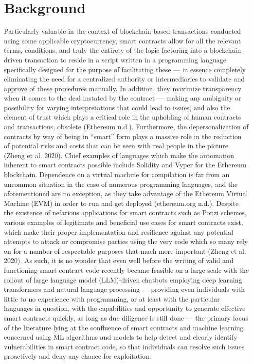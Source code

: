 \documentclass[
  11pt,
]{article}
\begin{document}
\hypertarget{background}{%
\section{Background}\label{background}}

Particularly valuable in the context of blockchain-based transactions
conducted using some applicable cryptocurrency, smart contracts allow
for all the relevant terms, conditions, and truly the entirety of the
logic factoring into a blockchain-driven transaction to reside in a
script written in a programming language specifically designed for the
purpose of facilitating these --- in essence completely eliminating the
need for a centralized authority or intermediaries to validate and
approve of these procedures manually. In addition, they maximize
transparency when it comes to the deal instated by the contract ---
making any ambiguity or possibility for varying interpretations that
could lead to issues, and also the element of trust which plays a
critical role in the upholding of human contracts and transactions,
obsolete (Ethereum n.d.). Furthermore, the depersonalization of
contracts by way of being in ``smart'' form plays a massive role in the
reduction of potential risks and costs that can be seen with real people
in the picture (Zheng et al. 2020). Chief examples of languages which
make the automation inherent to smart contracts possible include
Solidity and Vyper for the Ethereum blockchain. Dependence on a virtual
machine for compilation is far from an uncommon situation in the case of
numerous programming languages, and the aforementioned are no exception,
as they take advantage of the Ethereum Virtual Machine (EVM) in order to
run and get deployed (ethereum.org n.d.). Despite the existence of
nefarious applications for smart contracts such as Ponzi schemes,
various examples of legitimate and beneficial use cases for smart
contracts exist, which make their proper implementation and resilience
against any potential attempts to attack or compromise parties using the
very code which so many rely on for a number of respectable purposes
that much more important (Zheng et al. 2020). As such, it is no wonder
that even well before the writing of valid and functioning smart
contract code recently became feasible on a large scale with the rollout
of large language model (LLM)-driven chatbots employing deep learning
transformers and natural language processing --- providing even
individuals with little to no experience with programming, or at least
with the particular languages in question, with the capabilities and
opportunity to generate effective smart contracts quickly, as long as
due diligence is still done --- the primary focus of the literature
lying at the confluence of smart contracts and machine learning
concerned using ML algorithms and models to help detect and clearly
identify vulnerabilities in smart contract code, so that individuals can
resolve such issues proactively and deny any chance for exploitation.
\end{document}

